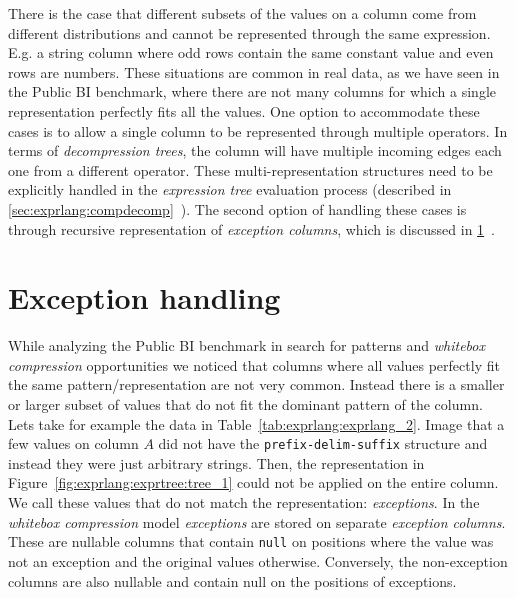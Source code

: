 There is the case that different subsets of the values on a column come from different distributions and cannot be represented through the same expression. E.g. a string column where odd rows contain the same constant value and even rows are numbers. These situations are common in real data, as we have seen in the Public BI benchmark, where there are not many columns for which a single representation perfectly fits all the values. One option to accommodate these cases is to allow a single column to be represented through multiple operators. In terms of \textit{decompression trees}, the column will have multiple incoming edges each one from a different operator. These multi-representation structures need to be explicitly handled in the \textit{expression tree} evaluation process (described in \ref{sec:exprlang:compdecomp}~). The second option of handling these cases is through recursive representation of \textit{exception columns}, which is discussed in \ref{sec:exprlang:exceptions}~.

\section{Exception handling}
\label{sec:exprlang:exceptions}

While analyzing the Public BI benchmark in search for patterns and \textit{whitebox compression} opportunities we noticed that columns where all values perfectly fit the same pattern/representation are not very common. Instead there is a smaller or larger subset of values that do not fit the dominant pattern of the column. Lets take for example the data in Table~\ref{tab:exprlang:exprlang_2}. Image that a few values on column \(A\) did not have the \verb|prefix-delim-suffix| structure and instead they were just arbitrary strings. Then, the representation in Figure~\ref{fig:exprlang:exprtree:tree_1} could not be applied on the entire column. We call these values that do not match the representation: \textit{exceptions}. In the \textit{whitebox compression} model \textit{exceptions} are stored on separate \textit{exception columns}. These are nullable columns that contain \verb|null| on positions where the value was not an exception and the original values otherwise. Conversely, the non-exception columns are also nullable and contain null on the positions of exceptions.

